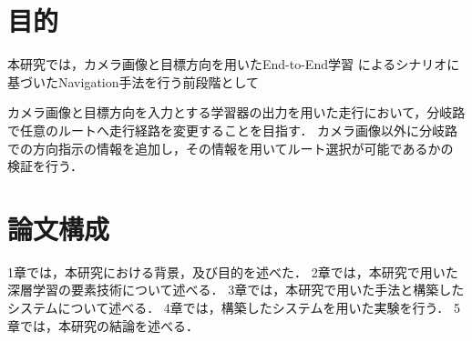 \section{目的}
本研究では，カメラ画像と目標方向を用いたEnd-to-End学習
によるシナリオに基づいたNavigation手法を行う前段階として

カメラ画像と目標方向を入力とする学習器の出力を用いた走行において，分岐路で任意のルートへ走行経路を変更することを目指す．
カメラ画像以外に分岐路での方向指示の情報を追加し，その情報を用いてルート選択が可能であるかの
検証を行う．


\section{論文構成}
1章では，本研究における背景，及び目的を述べた．
2章では，本研究で用いた深層学習の要素技術について述べる．
3章では，本研究で用いた手法と構築したシステムについて述べる．
4章では，構築したシステムを用いた実験を行う．
5章では，本研究の結論を述べる．
